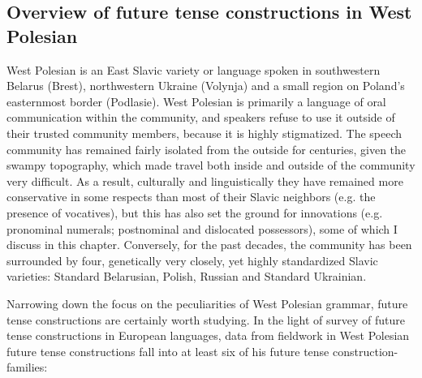 \documentclass[output=paper,colorlinks,citecolor=brown]{langscibook}
\begin{document}
\subsection{Overview of future tense constructions in West Polesian}
\label{sec:roncero:1.2}
West Polesian is an East Slavic variety or language spoken in southwestern Belarus (Brest), northwestern Ukraine (Volynja) and a small region on Poland’s easternmost border (Podlasie). West Polesian is primarily a language of oral communication within the community, and speakers refuse to use it outside of their trusted community members, because it is highly stigmatized. The speech community has remained fairly isolated from the outside for centuries, given the swampy topography, which made travel both inside and outside of the community very difficult. As a result, culturally and linguistically they have remained more conservative in some respects than most of their Slavic neighbors (e.g. the presence of vocatives), but this has also set the ground for innovations (e.g. pronominal numerals; postnominal and dislocated possessors), some of which I discuss in this chapter. Conversely, for the past decades, the community has been surrounded by four, genetically very closely, yet highly standardized Slavic varieties: Standard Belarusian, Polish, Russian and Standard Ukrainian.

Narrowing down the focus on the peculiarities of West Polesian grammar, future tense constructions are certainly worth studying. In the light of  survey of future tense constructions in European languages, data from fieldwork in West Polesian future tense constructions fall into at least six of his future tense construction-families: 
\end{document}
